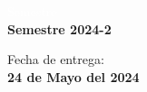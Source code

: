 \begin{titlepage}
    \vspace{17mm}

    \begin{minipage}{0.4\textwidth}
        \textcolor{white}{Semestre}\\
        \large\textbf{Semestre 2024-2}      
    \end{minipage}
    \begin{minipage}{0.4\textwidth}
        \begin{flushright}
            {\large Fecha de entrega:\\
             \textbf{24 de Mayo del 2024}}
        \end{flushright}
    \end{minipage}

    \makeatother

    \vfill 
    \end{titlepage}
